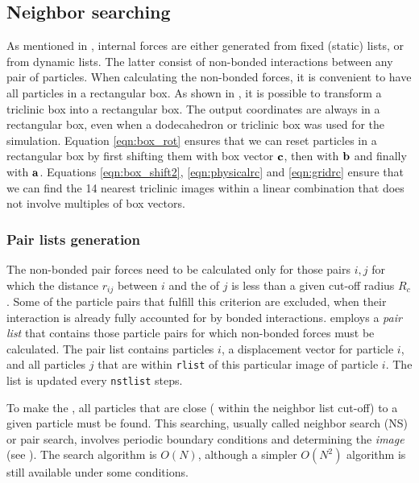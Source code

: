 \subsection{Neighbor searching}
\label{subsec:ns}
As mentioned in , internal forces are
either generated from fixed (static) lists, or from dynamic lists.
The latter consist of non-bonded interactions between any pair of particles.
When calculating the non-bonded forces, it is convenient to have all
particles in a rectangular box.
As shown in , it is possible to transform a
triclinic box into a rectangular box.
The output coordinates are always in a rectangular box, even when a
dodecahedron or triclinic box was used for the simulation.
Equation \ref{eqn:box_rot} ensures that we can reset particles
in a rectangular box by first shifting them with
box vector ${\bf c}$, then with ${\bf b}$ and finally with ${\bf a}$.
Equations \ref{eqn:box_shift2}, \ref{eqn:physicalrc} and \ref{eqn:gridrc}
ensure that we can find the 14 nearest triclinic images within
a linear combination that does not involve multiples of box vectors.

\subsubsection{Pair lists generation}
The non-bonded pair forces need to be calculated only for those pairs
$i,j$  for which the distance $r_{ij}$ between $i$ and the 
of $j$ is less than a given cut-off radius $R_c$. Some of the particle
pairs that fulfill this criterion are excluded, when their interaction
is already fully accounted for by bonded interactions.  {\gromacs}
employs a {\em pair list} that contains those particle pairs for which
non-bonded forces must be calculated.  The pair list contains particles
$i$, a displacement vector for particle $i$, and all particles $j$ that
are within \verb'rlist' of this particular image of particle $i$.  The
list is updated every \verb'nstlist' steps.

To make the , all particles that are close
({\ie} within the neighbor list cut-off) to a given particle must be found.
This searching, usually called neighbor search (NS) or pair search,
involves periodic boundary conditions and determining the {\em image}
(see ). The search algorithm is $O(N)$, although a simpler
$O(N^2)$ algorithm is still available under some conditions.

